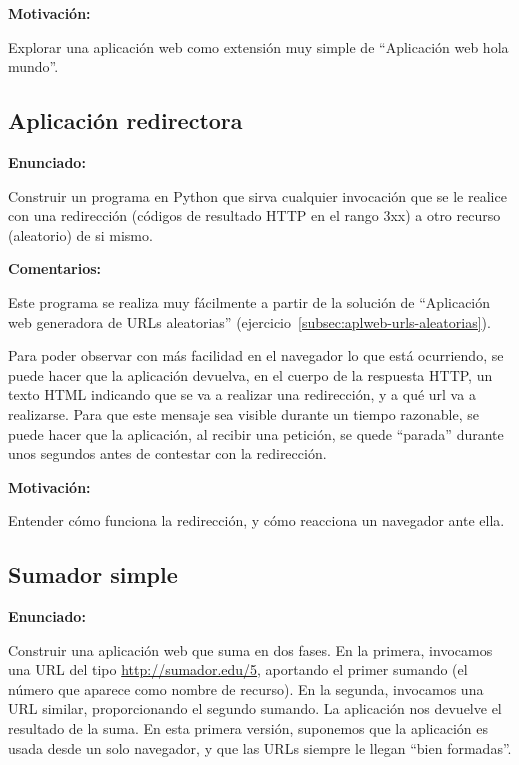 \textbf{Motivación:}

Explorar una aplicación web como extensión muy simple de ``Aplicación web hola mundo''.

\subsection{Aplicación redirectora}
\label{subsec:aplweb-redirectora}

\textbf{Enunciado:}

Construir un programa en Python que sirva cualquier invocación que se le realice con una redirección (códigos de resultado HTTP en el rango 3xx) a otro recurso (aleatorio) de si mismo. 

\textbf{Comentarios:}

Este programa se realiza muy fácilmente a partir de la solución de ``Aplicación web generadora de URLs aleatorias'' (ejercicio~\ref{subsec:aplweb-urls-aleatorias}).

Para poder observar con más facilidad en el navegador lo que está ocurriendo, se puede hacer que la aplicación devuelva, en el cuerpo de la respuesta HTTP, un texto HTML indicando que se va a realizar una redirección, y a qué url va a realizarse. Para que este mensaje sea visible durante un tiempo razonable, se puede hacer que la aplicación, al recibir una petición, se quede ``parada'' durante unos segundos antes de contestar con la redirección.

\textbf{Motivación:}

Entender cómo funciona la redirección, y cómo reacciona un navegador ante ella.

\subsection{Sumador simple}
\label{subsec:sumador-simple}

\textbf{Enunciado:}

Construir una aplicación web que suma en dos fases. En la primera, invocamos una URL del tipo \url{http://sumador.edu/5}, aportando el primer sumando (el número que aparece como nombre de recurso). En la segunda, invocamos una URL similar, proporcionando el segundo sumando. La aplicación nos devuelve el resultado de la suma. En esta primera versión, suponemos que la aplicación es usada desde un solo navegador, y que las URLs siempre le llegan ``bien formadas''.

